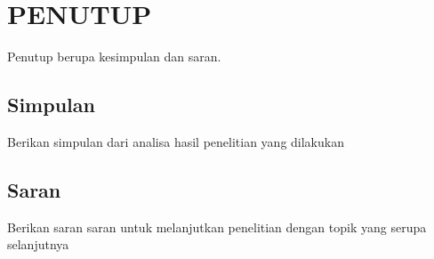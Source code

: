 \chapter{PENUTUP}
\label{chap: penutup}

Penutup berupa kesimpulan dan saran.

\section{Simpulan}
\label{sec: simpulan}
Berikan simpulan dari analisa hasil penelitian yang dilakukan

\section{Saran}
\label{sec:saran}
Berikan saran saran untuk melanjutkan penelitian dengan topik yang serupa selanjutnya
